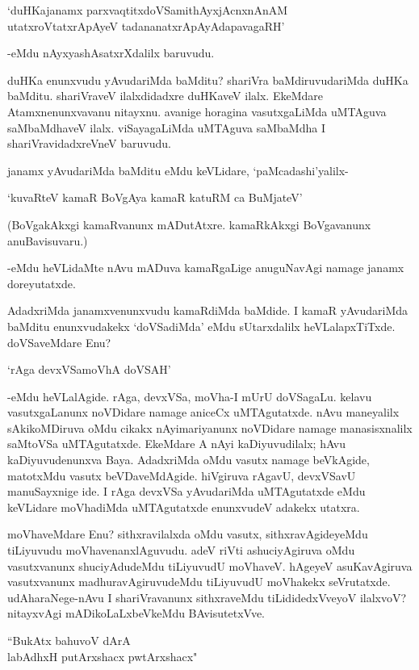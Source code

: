 \begin{shloka}
`duHKajanamx parxvaqtitxdoVSamithAyxjAcnxnAnAM\\
utatxroVtatxrApAyeV tadananatxrApAyAdapavagaRH'
\end{shloka}

-eMdu nAyxyashAsatxrXdalilx baruvudu.

duHKa enunxvudu yAvudariMda baMditu? shariVra baMdiruvudariMda duHKa baMditu. shariVraveV ilalxdidadxre duHKaveV ilalx. EkeMdare Atamxnenunxvavanu nitayxnu. avanige horagina vasutxgaLiMda uMTAguva saMbaMdhaveV ilalx. viSayagaLiMda uMTAguva saMbaMdha I shariVravidadxreVneV baruvudu.

janamx yAvudariMda baMditu eMdu keVLidare, `paMcadashi'yalilx-

\begin{shloka}
`kuvaRteV kamaR BoVgAya kamaR katuRM ca BuMjateV'
\end{shloka}

(BoVgakAkxgi kamaRvanunx mADutAtxre. kamaRkAkxgi BoVgavanunx anuBavisuvaru.)

-eMdu heVLidaMte nAvu mADuva kamaRgaLige anuguNavAgi namage janamx doreyutatxde.

AdadxriMda janamxvenunxvudu kamaRdiMda baMdide. I kamaR yAvudariMda baMditu enunxvudakekx `doVSadiMda' eMdu sUtarxdalilx heVLalapxTiTxde. doVSaveMdare Enu?

\begin{shloka}
`rAga devxVSamoVhA doVSAH'
\end{shloka}

-eMdu heVLalAgide. rAga, devxVSa, moVha-I mUrU doVSagaLu. kelavu vasutxgaLanunx noVDidare namage aniceCx uMTAgutatxde. nAvu maneyalilx sAkikoMDiruva oMdu cikakx nAyimariyanunx noVDidare namage manasisxnalilx saMtoVSa uMTAgutatxde. EkeMdare A nAyi kaDiyuvudilalx; hAvu kaDiyuvudenunxva Baya. AdadxriMda oMdu vasutx namage beVkAgide, matotxMdu vasutx beVDaveMdAgide. hiVgiruva rAgavU, devxVSavU manuSayxnige ide. I rAga devxVSa yAvudariMda uMTAgutatxde eMdu keVLidare moVhadiMda uMTAgutatxde enunxvudeV adakekx utatxra.

moVhaveMdare Enu? sithxravilalxda oMdu vasutx, sithxravAgideyeMdu tiLiyuvudu moVhavenanxlAguvudu. adeV riVti ashuciyAgiruva oMdu vasutxvanunx shuciyAdudeMdu tiLiyuvudU moVhaveV. hAgeyeV asuKavAgiruva vasutxvanunx madhuravAgiruvudeMdu tiLiyuvudU moVhakekx seVrutatxde. udAharaNege-nAvu I shariVravanunx sithxraveMdu tiLididedxVveyoV ilalxvoV? nitayxvAgi mADikoLaLxbeVkeMdu BAvisutetxVve.

\begin{shloka}
``BukAtx bahuvoV dArA\\
labAdhxH putArxshacx pwtArxshacx"
\end{shloka}

